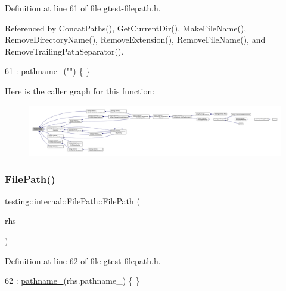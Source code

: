 Definition at line 61 of file gtest-\/filepath.\+h.



Referenced by Concat\+Paths(), Get\+Current\+Dir(), Make\+File\+Name(), Remove\+Directory\+Name(), Remove\+Extension(), Remove\+File\+Name(), and Remove\+Trailing\+Path\+Separator().


\begin{DoxyCode}
61 : \hyperlink{classtesting_1_1internal_1_1FilePath_a12ce28a0015f85604e0372230fa18d6e}{pathname\_}(\textcolor{stringliteral}{""}) \{ \}
\end{DoxyCode}
Here is the caller graph for this function\+:
\nopagebreak
\begin{figure}[H]
\begin{center}
\leavevmode
\includegraphics[width=350pt]{classtesting_1_1internal_1_1FilePath_a3504a51accbca78a52fe586133ea5499_icgraph}
\end{center}
\end{figure}
\mbox{\label{classtesting_1_1internal_1_1FilePath_ae9efd0fee56c6e3e2d659b464250b112}} 
\subsubsection{\texorpdfstring{File\+Path()}{FilePath()}\hspace{0.1cm}{\footnotesize\ttfamily [2/3]}}
{\footnotesize\ttfamily testing\+::internal\+::\+File\+Path\+::\+File\+Path (\begin{DoxyParamCaption}\item[{const \hyperlink{classtesting_1_1internal_1_1FilePath}{File\+Path} \&}]{rhs }\end{DoxyParamCaption})\hspace{0.3cm}{\ttfamily [inline]}}



Definition at line 62 of file gtest-\/filepath.\+h.


\begin{DoxyCode}
62 : \hyperlink{classtesting_1_1internal_1_1FilePath_a12ce28a0015f85604e0372230fa18d6e}{pathname\_}(rhs.pathname\_) \{ \}
\end{DoxyCode}
\mbox{\label{classtesting_1_1internal_1_1FilePath_a9fc072b140aa0652a7022fb809fe3abe}} 
